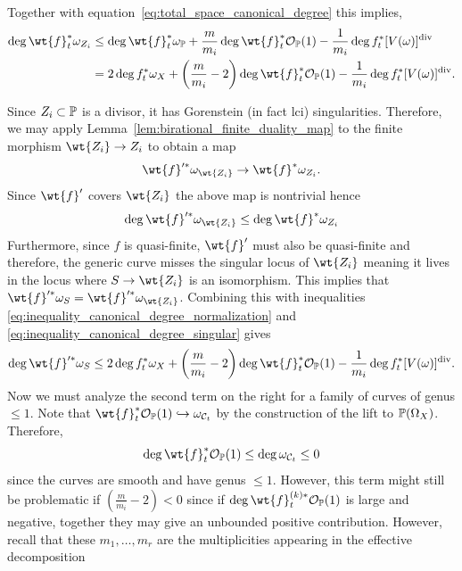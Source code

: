 \documentclass[main.tex]{subfiles}
\begin{document}
\par 
Together with equation~\eqref{eq:total_space_canonical_degree} this implies,
\begin{align} \label{eq:inequality_canonical_degree_singular}
\deg{\wt{f}_t^* \omega_{Z_i}} & \le \deg{\wt{f}_t^* \omega_{\P}} + \frac{m}{m_i} \deg{\wt{f}_t^* \cO_{\P}(1)} - \frac{1}{m_i} \deg{f_t^* [V(\omega)]^{\div}} 
\\
& = 2 \deg{f_t^* \omega_{X}} + \left( \frac{m}{m_i} - 2 \right) \deg{\wt{f}_t^* \cO_{\P}(1)} - \frac{1}{m_i} \deg{f_t^* [V(\omega)]^{\div}} .
\end{align}



Since $Z_i \subset \P$ is a divisor, it has Gorenstein (in fact lci) singularities. Therefore, we may apply Lemma~\ref{lem:birational_finite_duality_map} to the finite morphism $\wt{Z_i} \to Z_i$ to obtain a map
\[ \wt{f}'^* \omega_{\wt{Z_i}} \to \wt{f}^* \omega_{Z_i}. \]
Since $\wt{f}'$ covers $\wt{Z_i}$ the above map is nontrivial hence
\begin{equation} \label{eq:inequality_canonical_degree_normalization}
\deg{\wt{f}'^* \omega_{\wt{Z_i}}} \le \deg{\wt{f}^* \omega_{Z_i}}
\end{equation}
Furthermore, since $f$ is quasi-finite, $\wt{f}'$ must also be quasi-finite and therefore, the generic curve misses the singular locus of $\wt{Z_i}$ meaning it lives in the locus where $S \to \wt{Z_i}$ is an isomorphism. This implies that $\wt{f}'^* \omega_S = \wt{f}'^* \omega_{\wt{Z_i}}$. Combining this with inequalities \eqref{eq:inequality_canonical_degree_normalization} and \eqref{eq:inequality_canonical_degree_singular} gives
\begin{equation} \label{eq:covering_canonical_degree_inequality}
\deg{\wt{f}'^* \omega_S} \le 2 \deg{f_t^* \omega_{X}} + \left( \frac{m}{m_i} - 2 \right) \deg{\wt{f}_t^* \cO_{\P}(1)} - \frac{1}{m_i} \deg{f_t^* [V(\omega)]^{\div}}.
\end{equation}
Now we must analyze the second term on the right for a family of curves of genus $\le 1$. Note that $\wt{f}_t^{*} \cO_{\P}(1) \embed \omega_{\cC_t}$ by the construction of the lift to $\P(\Omega_{X})$. Therefore,
\[ \deg{\wt{f}_t^{*} \cO_{\P}(1)} \le \deg{\omega_{\cC_t}} \le 0 \]
since the curves are smooth and have genus $\le 1$. However, this term might still be problematic if $\left( \frac{m}{m_i} - 2 \right) < 0$ since if $\deg{\wt{f}_t^{(k)*} \cO_{\P}(1)}$ is large and negative, together they may give an unbounded positive contribution. However, recall that these $m_1, \dots, m_r$ are the multiplicities appearing in the effective decomposition
\end{document}
